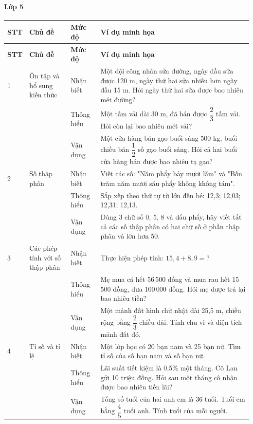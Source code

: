 \paragraph{Lớp 5}
\renewcommand{\arraystretch}{1.3}
\begin{longtable}{|>{\centering\arraybackslash}m{0.8cm}|m{3.5cm}|>{\centering\arraybackslash}m{2cm}|m{7.5cm}|}
	\hline
	\textbf{STT} & \textbf{Chủ đề} & \textbf{Mức độ} & \textbf{Ví dụ minh họa} \\
	\hline
	\endfirsthead
	\hline
	\textbf{STT} & \textbf{Chủ đề} & \textbf{Mức độ} & \textbf{Ví dụ minh họa} \\
	\hline
	\endhead
	\hline
	\endfoot

	1 & Ôn tập và bổ sung kiến thức
	& Nhận biết & Một đội công nhân sửa đường, ngày đầu sửa được 120 m, ngày thứ hai sửa nhiều hơn ngày đầu 15 m. Hỏi ngày thứ hai sửa được bao nhiêu mét đường? \\
	\cline{3-4}
	& & Thông hiểu & Một tấm vải dài 30 m, đã bán được $\dfrac{2}{3}$ tấm vải. Hỏi còn lại bao nhiêu mét vải? \\
	\cline{3-4}
	& & Vận dụng & Một cửa hàng bán gạo buổi sáng 500 kg, buổi chiều bán $\dfrac{1}{2}$ số gạo buổi sáng. Hỏi cả hai buổi cửa hàng bán được bao nhiêu tạ gạo? \\
	\hline

	2 & Số thập phân
	& Nhận biết & Viết các số: "Năm phẩy bảy mươi lăm" và "Bốn trăm năm mươi sáu phẩy không không tám". \\
	\cline{3-4}
	& & Thông hiểu & Sắp xếp theo thứ tự từ lớn đến bé: 12,3; 12,03; 12,31; 12,13. \\
	\cline{3-4}
	& & Vận dụng & Dùng 3 chữ số 0, 5, 8 và dấu phẩy, hãy viết tất cả các số thập phân có hai chữ số ở phần thập phân và lớn hơn 50. \\
	\hline

	3 & Các phép tính với số thập phân
	& Nhận biết & Thực hiện phép tính: $15{,}4 + 8{,}9 = ?$ \\
	\cline{3-4}
	& & Thông hiểu & Mẹ mua cá hết 56\,500 đồng và mua rau hết 15\,500 đồng, đưa 100\,000 đồng. Hỏi mẹ được trả lại bao nhiêu tiền? \\
	\cline{3-4}
	& & Vận dụng & Một mảnh đất hình chữ nhật dài 25,5 m, chiều rộng bằng $\dfrac{2}{3}$ chiều dài. Tính chu vi và diện tích mảnh đất đó. \\
	\hline

	4 & Tỉ số và tỉ lệ
	& Nhận biết & Một lớp học có 20 bạn nam và 25 bạn nữ. Tìm tỉ số của số bạn nam và số bạn nữ. \\
	\cline{3-4}
	& & Thông hiểu & Lãi suất tiết kiệm là 0,5\% một tháng. Cô Lan gửi 10 triệu đồng. Hỏi sau một tháng cô nhận được bao nhiêu tiền lãi? \\
	\cline{3-4}
	& & Vận dụng & Tổng số tuổi của hai anh em là 36 tuổi. Tuổi em bằng $\dfrac{4}{5}$ tuổi anh. Tính tuổi của mỗi người. \\
	\hline


\end{longtable}
